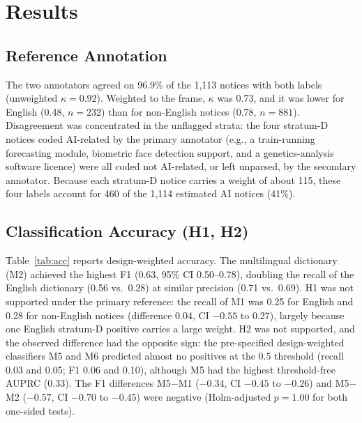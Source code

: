 \section{Results}
\subsection{Reference Annotation}
The two annotators agreed on 96.9\% of the 1,113 notices with both labels (unweighted $\kappa=0.92$). Weighted to the frame, $\kappa$ was 0.73, and it was lower for English (0.48, $n=232$) than for non-English notices (0.78, $n=881$). Disagreement was concentrated in the unflagged strata: the four stratum-D notices coded AI-related by the primary annotator (e.g., a train-running forecasting module, biometric face detection support, and a genetics-analysis software licence) were all coded not AI-related, or left unparsed, by the secondary annotator. Because each stratum-D notice carries a weight of about 115, these four labels account for 460 of the 1,114 estimated AI notices (41\%).

\subsection{Classification Accuracy (H1, H2)}
Table~\ref{tab:acc} reports design-weighted accuracy. The multilingual dictionary (M2) achieved the highest F1 (0.63, 95\% CI 0.50--0.78), doubling the recall of the English dictionary (0.56 vs.\ 0.28) at similar precision (0.71 vs.\ 0.69). H1 was not supported under the primary reference: the recall of M1 was 0.25 for English and 0.28 for non-English notices (difference 0.04, CI $-0.55$ to 0.27), largely because one English stratum-D positive carries a large weight. H2 was not supported, and the observed difference had the opposite sign: the pre-specified design-weighted classifiers M5 and M6 predicted almost no positives at the 0.5 threshold (recall 0.03 and 0.05; F1 0.06 and 0.10), although M5 had the highest threshold-free AUPRC (0.33). The F1 differences M5$-$M1 ($-0.34$, CI $-0.45$ to $-0.26$) and M5$-$M2 ($-0.57$, CI $-0.70$ to $-0.45$) were negative (Holm-adjusted $p=1.00$ for both one-sided tests). \MTHREETEXT

